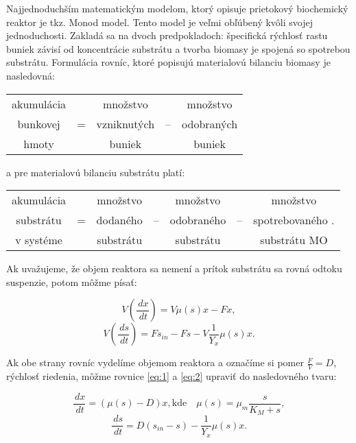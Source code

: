 Najjednoduchším matematickým modelom, ktorý opisuje prietokový biochemický reaktor je tkz. Monod model. Tento model je veľmi obľúbený kvôli svojej jednoduchosti. Zakladá sa na dvoch predpokladoch:  špecifická rýchlosť rastu buniek závisí od koncentrácie substrátu a   tvorba biomasy je spojená so spotrebou substrátu. Formulácia rovníc, ktoré popisujú materialovú bilanciu biomasy je nasledovná:
\begin{table}[H]
	\centering
	\begin{tabular}{ccccc}
		akumulácia & & množstvo & & množstvo \\
		bunkovej & = & vzniknutých & -- & odobraných \\
		hmoty & & buniek & & buniek \\
	\end{tabular}
\end{table}
\noindent a pre materialovú bilanciu substrátu platí:
\begin{table}[H]
	\centering
	\begin{tabular}{ccccccc}
		akumulácia & & množstvo & & množstvo & & množstvo\\
		substrátu & = & dodaného & -- & odobraného & -- & spotrebovaného .\\
		v systéme & & substrátu & & substrátu & & substrátu MO\\
	\end{tabular}
\end{table}
\noindent Ak uvažujeme, že objem reaktora sa nemení a prítok substrátu sa rovná odtoku suspenzie, potom môžme písať: 

\begin{equation} \label{eq:1}
	V\left(\frac{\,dx}{\,dt}\right) = V\mu(s)x - Fx,
\end{equation}
\begin{equation} \label{eq:2}
	V\left(\frac{\,ds}{\,dt}\right) = Fs_{in} - Fs - V\frac{1}{Y_{x}}\mu(s)x.
\end{equation}

\noindent Ak obe strany rovníc vydelíme objemom reaktora a označíme si pomer $\frac{F}{V} = D$, rýchlosť riedenia, môžme rovnice \ref{eq:1} a \ref{eq:2} upraviť do nasledovného tvaru:

\begin{equation} \label{eq:3}
	\frac{\,dx}{\,dt} = \left(\mu(s) - D\right)x, \text{kde}  \quad \mu(s) = \mu_{m}\frac{s}{K_{M} + s},
\end{equation}
\begin{equation} \label{eq:4}
	\frac{\,ds}{\,dt} = D\left(s_{in} - s\right) - \frac{1}{Y_{x}}\mu(s)x.
\end{equation}

